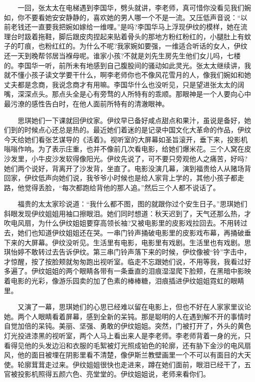 \documentclass[12pt,UTF8]{ctexbook}
\begin{document}
　　一回，张太太在电梯遇到李国华，劈头就讲，李老师，真可惜你没看见我们婉如，你不要看她安安静静的，喜欢她的男人哪一个不是一流。又压低声音说：\enquote{以前老钱还一直要我把婉如嫁给一维哩。}是吗?李国华马上浮现伊纹的模样，她在流理台时趿着拖鞋，脚后跟皮肉捏起来贴着骨头的那地方粉红粉红的，小腿肚上有蚊子的叮痕，也粉红红的。为什么不呢?我家婉如要强，一维适合听话的女人，伊纹还一天到晚帮邻居当褓母呢。谁家小孩?不就是刘先生房先生他们女儿吗，七楼的。李国华一听，前所未有地感到自己腹股间的骚动如此灵光。张太太继续讲，我就不懂小孩子读文学要干什么，啊李老师你也不像风花雪月的人，像我们婉如和她丈夫都是念商，我说念商才有用嘛。李国华什么也没听见，只是望进张太太的阔嘴，深深点头。那点头全是心有旁骛的人所特有的乖顺。那眼神是一个人要向心中最污潦的感性告白时，在他人面前所特有的清澈眼神。

　　思琪她们一下课就回伊纹家。伊纹早已备好咸点甜点和果汁，虽说是备好，她们到的时候点心还总是热的。最近她们着迷的是记录中国文化大革命的作品，伊纹今天给她们看张艺谋导的《活着》。视听室的大屏幕如圣旨滚开，垂下来，投影机嗡嗡作响。为了表示庄重，也并不像前几次看电影，给她们爆米花。三个人窝在皮沙发里，小牛皮沙发软得像阳光。伊纹先说了，可不要只旁观他人之痛苦，好吗?她们两个说好，背离开了沙发背，坐直了。电影没演几幕，演到福贵给人从赌场背回家，伊纹低声向她们说，我爷爷小时候也是给人家背上学的，其他小孩子都走路，他觉得丢脸，\enquote{每次都跑给背他的那人追。}然后三个人都不说话了。

　　福贵的太太家珍说道：\enquote{我什么都不图，图的就跟你过个安生日子。}思琪她们斜眼发现伊纹姐姐用袖口擦眼泪。她们同时想道：秋天迟到了，天气还那么热，才吹电风扇，为什么伊纹姐姐要穿高领长袖?又被电影里的皮影戏拉回去。不用转过去，她们也知道伊纹姐姐还在哭。一串门铃声捅破电影里的皮影戏布幕，再捅破垂下来的大屏幕。伊纹没听见。生活里有电影，电影里有戏剧。生活里也有戏剧。思琪怡婷不敢转过去告诉伊纹。第三串门铃声落下来的时候，伊纹像被\enquote{铃}字击中，才惊醒，按了按脸颊就匆匆跑出视听室。临走不忘跟她们说，不用等我，我看过好多遍了。伊纹姐姐的两个眼睛各带有一条垂直的泪痕湿湿爬下脸颊，在黑暗中影映着电影的光彩，像游乐园卖的加了色素的棒棒糖，泪痕插进伊纹姐姐霓虹的眼睛里。

　　又演了一幕，思琪她们的心思已经难以留在电影上，但也不好在人家家里议论她。两个人眼睛看着屏幕，感到全新的呆钝。那是聪明的人在遇到解不开的事情时自觉加倍的呆钝。美丽、坚强、勇敢的伊纹姐姐。突然，门被打开了，外头的黄色灯光投进漆黑的视听室，两个人马上看出来人是李老师。李老师背着一身的光，只看得见他的头发边沿和衣服的毛絮被灯光照成铂色的轮廓，还有胁下金沙的电风扇风，他的面目被埋在阴影里看不清楚，像伊斯兰教壁画里一个不可以有面目的大天使。轮廓茸茸走过来。伊纹姐姐很快也走进来，蹲在她们面前，眼泪已经干了，五官被投影机照得五颜六色、亮堂堂的。伊纹姐姐说，老师来看你们。
\end{document}
